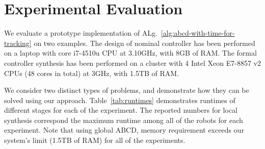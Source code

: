 
\section{Experimental Evaluation}\label{sec:experiments}
We evaluate a prototype implementation of ALg.~\ref{alg:abcd-with-time-for-tracking}
on two examples. 
The design of nominal controller has been performed on a laptop with core i7-4510u CPU at 3.10GHz, with 8GB of
RAM.
The formal controller synthesis has been performed
on a cluster with 4 Intel Xeon E7-8857 v2 CPUs (48 cores in total) at 3GHz, with 1.5TB of
RAM. %

We consider two distinct types of problems, and demonstrate how they can be solved using our approach. Table~\ref{tab:runtimes} demonstrates  runtimes of different stages for each of the experiment. The reported numbers for local synthesis correspond the maximum runtime among all of the robots for each experiment. Note that using global ABCD, memory requirement exceeds our system's limit (1.5TB of RAM) for all of the experiments.

